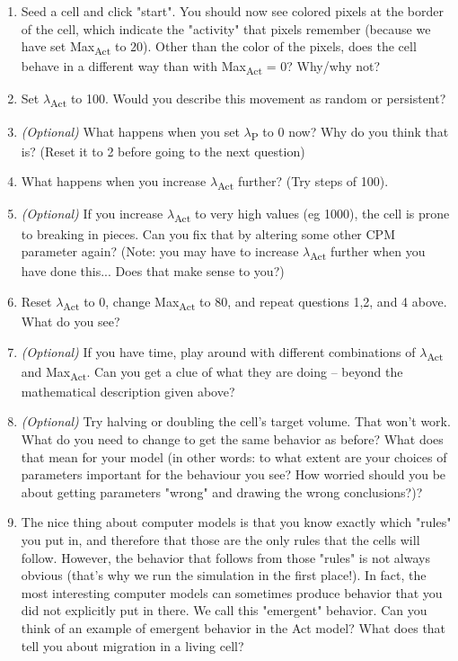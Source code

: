 \documentclass{article}
\begin{document}
\begin{enumerate}
	\item Seed a cell and click "start". You should now see colored pixels at the border of the cell, which indicate the "activity" that pixels remember (because we have set Max\textsubscript{Act} to 20). Other than the color of the pixels, does the cell behave in a different way than with Max\textsubscript{Act} = 0? Why/why not?
	\item Set $\lambda$\textsubscript{Act} to 100. Would you describe this movement as random or persistent?
	\item \textit{(Optional)} What happens when you set $\lambda$\textsubscript{P} to 0 now? Why do you think that is? (Reset it to 2 before going to the next question)
	\item What happens when you increase $\lambda$\textsubscript{Act} further? (Try steps of 100).
	\item \textit{(Optional)} If you increase $\lambda$\textsubscript{Act} to very high values (eg 1000), the cell is prone to breaking in pieces. Can you fix that by altering some other CPM parameter again? (Note: you may have to increase $\lambda$\textsubscript{Act} further when you have done this... Does that make sense to you?)
	\item Reset $\lambda$\textsubscript{Act} to 0, change Max\textsubscript{Act} to 80, and repeat questions 1,2, and 4 above. What do you see? 
	\item \textit{(Optional)} If you have time, play around with different combinations of $\lambda$\textsubscript{Act} and Max\textsubscript{Act}. Can you get a clue of what they are doing -- beyond the mathematical description given above?
	\item \textit{(Optional)} Try halving or doubling the cell's target volume. That won't work. What do you need to change to get the same behavior as before? What does that mean for your model (in other words: to what extent are your choices of parameters important for the behaviour you see? How worried should you be about getting parameters "wrong" and drawing the wrong conclusions?)? 
	\item The nice thing about computer models is that you know exactly which "rules" you put in, and therefore that those are the only rules that the cells will follow. However, the behavior that follows from those "rules" is not always obvious (that's why we run the simulation in the first place!). In fact, the most interesting computer models can sometimes produce behavior that you did not explicitly put in there. We call this "emergent" behavior. Can you think of an example of emergent behavior in the Act model? What does that tell you about migration in a living cell?
\end{enumerate} 
\end{document}
